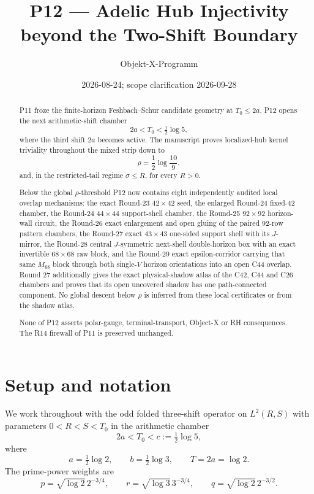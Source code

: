\documentclass[11pt,a4paper]{amsart}
\title[P12 --- Adelic Hub Injectivity]{P12 --- Adelic Hub Injectivity beyond the Two-Shift Boundary}
\author{Objekt-X-Programm}
\date{2026-08-24; scope clarification 2026-09-28}
\begin{document}
\begin{abstract}
P11 froze the finite-horizon Feshbach--Schur candidate geometry at
\(T_0\le 2a\). P12 opens the next arithmetic-shift chamber
\[
2a<T_0<\tfrac12\log5,
\]
where the third shift \(2a\) becomes active. The manuscript proves
localized-hub kernel triviality throughout the mixed strip down to
\[
\rho=\frac12\log\frac{10}{9},
\]
and, in the restricted-tail regime \(\sigma\le R\), for every \(R>0\).

Below the global \(\rho\)-threshold P12 now contains eight independently
audited local overlap mechanisms: the exact Round-23 \(42\times42\) seed,
the enlarged Round-24 fixed-42 chamber, the Round-24 \(44\times44\)
support-shell chamber, the Round-25 \(92\times92\) horizon-wall circuit,
the Round-26 exact enlargement and open gluing of the paired 92-row pattern
chambers, the Round-27 exact \(43\times43\) one-sided support shell with
its \(J\)-mirror, the Round-28 central \(J\)-symmetric next-shell
double-horizon box with an exact invertible \(68\times68\) raw block, and
the Round-29 exact epsilon-corridor carrying that same \(M_{68}\) block
through both single-\(V\) horizon orientations into an open C44 overlap.
Round 27 additionally gives the exact physical-shadow atlas of the C42, C44
and C26 chambers and proves that its open uncovered shadow has one
path-connected component. No global descent below \(\rho\) is inferred
from these local certificates or from the shadow atlas.

None of P12 asserts polar-gauge, terminal-transport, Object-X or RH
consequences. The R14 firewall of P11 is preserved unchanged.
\end{abstract}

\maketitle

\section{Setup and notation}\label{sec:p12-setup}

We work throughout with the odd folded three-shift operator on
\(L^2(R,S)\) with parameters \(0<R<S<T_0\) in the arithmetic chamber
\[
2a<T_0<c:=\tfrac12\log5,
\]
where
\[
a=\tfrac12\log2,\qquad
b=\tfrac12\log3,\qquad
T=2a=\log2.
\]
The prime-power weights are
\[
p=\sqrt{\log2}\,2^{-3/4},\qquad
r=\sqrt{\log3}\,3^{-3/4},\qquad
q=\sqrt{\log2}\,2^{-3/2}.
\]
\end{document}
